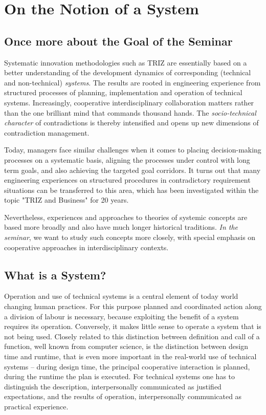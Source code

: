 \documentclass[11pt,a4paper]{article}
\begin{document}
\section{On the Notion of a System}

\subsection{Once more about the Goal of the Seminar}

Systematic innovation methodologies such as TRIZ are essentially based on a
better understanding of the development dynamics of corresponding (technical
and non-technical) \emph{systems}.  The results are rooted in engineering
experience from structured processes of planning, implementation and operation
of technical systems. Increasingly, cooperative interdisciplinary
collaboration matters rather than the one brilliant mind that commands
thousand hands. The \emph{socio-technical character} of contradictions is
thereby intensified and opens up new dimensions of contradiction management.

Today, managers face similar challenges when it comes to placing
decision-making processes on a systematic basis, aligning the processes under
control with long term goals, and also achieving the targeted goal corridors.
It turns out that many engineering experiences on structured procedures in
contradictory requirement situations can be transferred to this area, which
has been investigated within the topic "TRIZ and Business" for 20 years.

Nevertheless, experiences and approaches to theories of systemic concepts are
based more broadly and also have much longer historical traditions.  \emph{In
  the seminar}, we want to study such concepts more closely, with special
emphasis on cooperative approaches in interdisciplinary contexts.

\subsection{What is a System?}

Operation and use of technical systems is a central element of today world
changing human practices. For this purpose planned and coordinated action
along a division of labour is necessary, because exploiting the benefit of a
system requires its operation. Conversely, it makes little sense to operate a
system that is not being used. Closely related to this distinction between
definition and call of a function, well known from computer science, is the
distinction between design time and runtime, that is even more important in
the real-world use of technical systems – during design time, the principal
cooperative interaction is planned, during the runtime the plan is executed.
For technical systems one has to distinguish the description, interpersonally
communicated as justified expectations, and the results of operation,
interpersonally communicated as practical experience.
\end{document}
